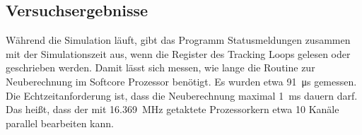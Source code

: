 \subsection{Versuchsergebnisse}
Während die Simulation läuft, gibt das Programm Statusmeldungen zusammen mit der Simulationszeit aus, wenn die Register des Tracking Loops gelesen oder geschrieben werden. Damit lässt sich messen, wie lange die Routine zur Neuberechnung im Softcore Prozessor benötigt. Es wurden etwa \SI{91}{\micro\second} gemessen. Die Echtzeitanforderung ist, dass die Neuberechnung maximal \SI{1}{\milli\second} dauern darf. Das heißt, dass der mit \SI{16.369}{\mega\hertz} getaktete Prozessorkern etwa 10 Kanäle parallel bearbeiten kann.

